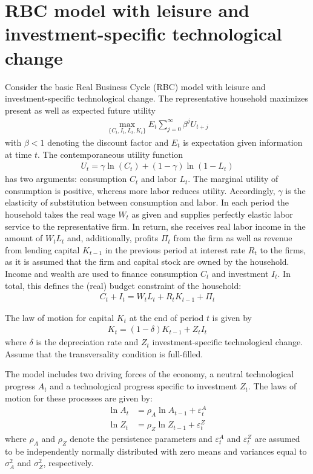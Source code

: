 \documentclass[a4paper]{scrartcl}
\begin{document}
    \section{RBC model with leisure and investment-specific technological change}
    Consider the basic Real Business Cycle (RBC) model with leisure and investment-specific technological change. The representative household maximizes present as well as expected future utility
    \begin{align*}
        \underset{\{C_{t},I_{t},L_t,K_{t}\}}{\max} E_t \sum_{j=0}^{\infty} \beta^{j} U_{t+j}
    \end{align*}
    with $\beta <1$ denoting the discount factor and $E_t$ is expectation given information at time $t$. The contemporaneous utility function 
    \begin{align*}
        U_t = \gamma \ln(C_t) + (1-\gamma) \ln{(1-L_t)}
    \end{align*}
    has two arguments: consumption $C_t$ and labor $L_t$. The marginal utility of consumption is positive, whereas more labor reduces utility. Accordingly, $\gamma$ is the elasticity of substitution between consumption and labor. In each period the household takes the real wage $W_t$ as given and supplies perfectly elastic labor service to the representative firm. In return, she receives real labor income in the amount of $W_t L_t$ and, additionally, profits $\Pi_t$ from the firm as well as revenue from lending capital $K_{t-1}$ in the previous period at interest rate $R_t$ to the firms, as it is assumed that the firm and capital stock are owned by the household. Income and wealth are used to finance consumption $C_t$ and investment $I_t$. In total, this defines the (real) budget constraint of the household:
    \begin{align*}
        C_t + I_t = W_t L_t + R_t K_{t-1} + \Pi_t
    \end{align*}
    
    The law of motion for capital $K_t$ at the end of period $t$ is given by
    \begin{align*}
        K_{t} = (1-\delta)K_{t-1} + Z_t I_t
    \end{align*}
    where $\delta$ is the depreciation rate and $Z_t$ investment-specific technological change. Assume that the transversality condition is full-filled.
    
    The model includes two driving forces of the economy, a neutral technological progress $A_t$ and a technological progress specific to investment $Z_t$. The laws of motion for these processes are given by:
    \begin{align*}
        \ln{A_{t}} & = \rho_A \ln{A_{t-1}}  + \varepsilon_t^A \\
        \ln{Z_{t}} & = \rho_Z \ln{Z_{t-1}}  + \varepsilon_t^Z
    \end{align*}
    where $\rho_A$ and $\rho_Z$ denote the persistence parameters and $\varepsilon_t^A$ and $\varepsilon_t^Z$ are assumed to be independently normally distributed with zero means and variances equal to $\sigma_A^2$ and $\sigma_Z^2$, respectively.
    
\end{document}
